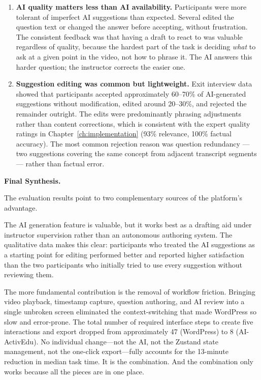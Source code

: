 \begin{enumerate}
    \item \textbf{AI quality matters less than AI availability.} Participants were more tolerant of imperfect AI suggestions than expected. Several edited the question text or changed the answer before accepting, without frustration. The consistent feedback was that having a draft to react to was valuable regardless of quality, because the hardest part of the task is deciding \emph{what} to ask at a given point in the video, not how to phrase it. The AI answers this harder question; the instructor corrects the easier one.

    \item \textbf{Suggestion editing was common but lightweight.} Exit interview data showed that participants accepted approximately 60--70\% of AI-generated suggestions without modification, edited around 20--30\%, and rejected the remainder outright. The edits were predominantly phrasing adjustments rather than content corrections, which is consistent with the expert quality ratings in Chapter~\ref{ch:implementation} (93\% relevance, 100\% factual accuracy). The most common rejection reason was question redundancy --- two suggestions covering the same concept from adjacent transcript segments --- rather than factual error.
\end{enumerate}

\textbf{Final Synthesis.}

The evaluation results point to two complementary sources of the platform's advantage.

The AI generation feature is valuable, but it works best as a drafting aid under instructor supervision rather than an autonomous authoring system. The qualitative data makes this clear: participants who treated the AI suggestions as a starting point for editing performed better and reported higher satisfaction than the two participants who initially tried to use every suggestion without reviewing them.

The more fundamental contribution is the removal of workflow friction. Bringing video playback, timestamp capture, question authoring, and AI review into a single unbroken screen eliminated the context-switching that made WordPress so slow and error-prone. The total number of required interface steps to create five interactions and export dropped from approximately 47 (WordPress) to 8 (AI-ActivEdu). No individual change---not the AI, not the Zustand state management, not the one-click export---fully accounts for the 13-minute reduction in median task time. It is the combination. And the combination only works because all the pieces are in one place.

